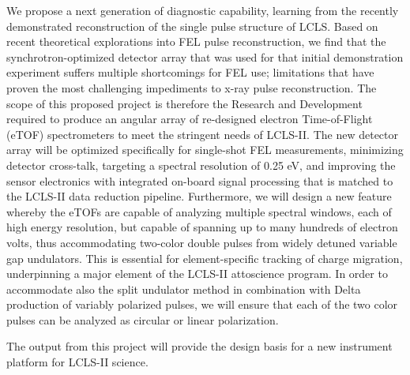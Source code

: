 We propose a next generation of diagnostic capability, learning from the recently demonstrated reconstruction of the single pulse structure of LCLS. 
Based on recent theoretical explorations into FEL pulse reconstruction, we find that the synchrotron-optimized detector array that was used for that initial demonstration experiment suffers multiple shortcomings for FEL use; limitations that have proven the most challenging impediments to x-ray pulse reconstruction. 
The scope of this proposed project is therefore the Research and Development required to produce an angular array of re-designed electron Time-of-Flight (eTOF) spectrometers to meet the stringent needs of LCLS-II. 
The new detector array will be optimized specifically for single-shot FEL measurements, minimizing detector cross-talk, targeting a spectral resolution of 0.25 eV, and improving the sensor electronics with integrated on-board signal processing that is matched to the LCLS-II data reduction pipeline. 
Furthermore, we will design a new feature whereby the eTOFs are capable of analyzing multiple spectral windows, each of high energy resolution, but capable of spanning up to many hundreds of electron volts, thus accommodating two-color double pulses from widely detuned variable gap undulators. 
This is essential for element-specific tracking of charge migration, underpinning a major element of the LCLS-II attoscience program. 
In order to accommodate also the split undulator method in combination with Delta production of variably polarized pulses, we will ensure that each of the two color pulses can be analyzed as circular or linear polarization.

The output from this project will provide the design basis for a new instrument platform for LCLS-II science.




